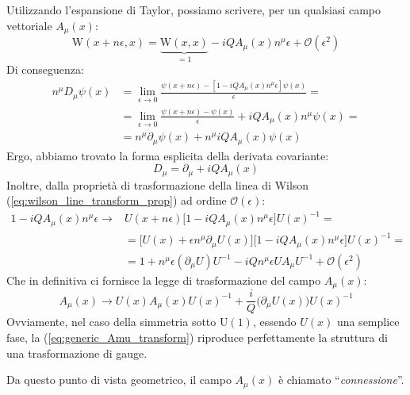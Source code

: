 \documentclass[../main.tex]{subfiles}
\begin{document}
\begin{enumerate}
    Utilizzando l'espansione di Taylor, possiamo scrivere, per un qualsiasi campo vettoriale $A_\mu(x)$:
    \begin{equation}
        \textrm{W}(x+n\epsilon,x) = \underbrace{\textrm{W}(x,x)}_{=1} - iQA_\mu(x)n^\mu\epsilon + \mathscr{O}(\epsilon^2)
        \label{eq:wilson_line}
    \end{equation}
    Di conseguenza:
    \begin{align*}
        n^\mu D_\mu\psi(x) &= \lim_{\epsilon\rightarrow0} \frac{\psi(x+n\epsilon) - [1 - iQA_\mu(x)n^\mu\epsilon]\psi(x)}{\epsilon} =\\
        &= \lim_{\epsilon\rightarrow0} \frac{\psi(x+n\epsilon) - \psi(x)}{\epsilon} + iQA_\mu(x)n^\mu\psi(x) =\\
        &=n^\mu \partial_\mu\psi(x) + n^\mu iQA_\mu(x)\psi(x)
    \end{align*}
    Ergo, abbiamo trovato la forma esplicita della derivata covariante:
    \begin{equation}
        \boxed{D_\mu= \partial_\mu + iQA_\mu(x)}
        \label{eq:covder_explicit_form}
    \end{equation}
    Inoltre, dalla proprietà di trasformazione della linea di Wilson (\ref{eq:wilson_line_transform_prop}) ad ordine $\mathscr{O}(\epsilon)$:
    \begin{align*}
        1 - iQA_\mu(x)n^\mu\epsilon \rightarrow &U(x+n\epsilon)\big[1 - iQA_\mu(x)n^\mu\epsilon\big]U(x)^{-1} = \\
        &=\big[U(x) +\epsilon n^\mu\partial_\mu U(x)\big]\big[1 - iQA_\mu(x)n^\mu\epsilon\big]U(x)^{-1} =\\
        &=1 + n^\mu\epsilon(\partial_\mu U) U^{-1} - iQn^\mu\epsilon UA_\mu U^{-1} + \mathscr{O}(\epsilon^2)
    \end{align*}
    Che in definitiva ci fornisce la legge di trasformazione del campo $A_\mu(x)$:
    \begin{equation}
        \boxed{A_\mu(x) \rightarrow U(x)A_\mu(x) U(x)^{-1} + \frac{i}{Q}\big(\partial_\mu U(x)\big) U(x)^{-1}}
        \label{eq:generic_Amu_transform}
    \end{equation}
    Ovviamente, nel caso della simmetria sotto $\textrm{U}(1)$, essendo $U(x)$ una semplice fase, la (\ref{eq:generic_Amu_transform}) riproduce perfettamente la struttura di una trasformazione di gauge.
    
    Da questo punto di vista geometrico, il campo $A_\mu(x)$ è chiamato “\textit{connessione}”.
    

\end{enumerate}
\end{document}
